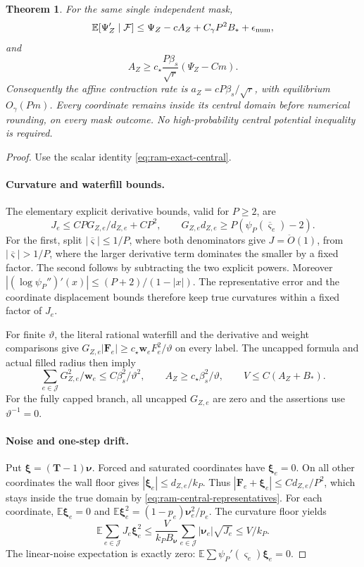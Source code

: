 \documentclass[11pt]{article}
\newtheorem{theorem}{Theorem}[section]
\theoremstyle{remark}
\newcommand{\ww}{\mathbf w}
\newcommand{\vvs}{\boldsymbol{\varsigma}}
\newcommand{\vvsbar}{\overline{\boldsymbol{\varsigma}}}
\newcommand{\FF}{\mathbf F}
\newcommand{\TT}{\mathbf T}
\newcommand{\nnu}{\boldsymbol{\nu}}
\newcommand{\xxi}{\boldsymbol{\xi}}
\newcommand{\Ex}{\mathbb E}
\renewcommand{\O}{\ddot{O}}
\begin{document}
\begin{theorem}
\label{thm:ram-central}
For the same single independent mask,
\[
 \Ex[\Psi_Z'\mid\mathcal F]
       \le\Psi_Z-cA_Z+C_\gamma P^2B_*+\epsilon_{\rm num},
\]
and
\[
 A_Z\ge c_\star\frac{P\beta_s}{\sqrt r}(\Psi_Z-Cm).
\]
Consequently the affine contraction rate is $a_Z=cP\beta_s/\sqrt r$, with
equilibrium $O_\gamma(Pm)$.
Every coordinate remains inside its central domain before numerical rounding, on
every mask outcome.
No high-probability central potential inequality is required.
\end{theorem} \begin{proof} Use the scalar identity
\eqref{eq:ram-exact-central}.

\paragraph{Curvature and waterfill bounds.}
The elementary explicit derivative bounds, valid for $P\ge2$, are
\[
 J_e\le CP G_{Z,e}/d_{Z,e}+CP^2,
 \qquad G_{Z,e}d_{Z,e}\ge P(\psi_P(\vvsbar_e)-2).
\]
For the first, split $|\vvsbar|\le1/P$, where both denominators give $J=\O(1)$, from
$|\vvsbar|>1/P$, where the larger derivative term dominates the smaller by a fixed
factor.
The second follows by subtracting the two explicit powers.
Moreover $|(\log\psi_P'')'(x)|\le(P+2)/(1-|x|)$.
The representative error and the coordinate displacement bounds therefore keep
true curvatures within a fixed factor of $J_e$.

For finite $\vartheta$, the literal rational waterfill and the derivative and
weight comparisons give $G_{Z,e}|\FF_e|\ge c_\star \ww_eF_e^2/\vartheta$ on every label.
The uncapped formula and actual filled radius then imply
\[
 \sum_{e\in\mathcal J}G_{Z,e}^2/\ww_e
                         \le C\beta_s^2/\vartheta^2,
 \qquad A_Z\ge c_\star\beta_s^2/\vartheta,
 \qquad V\le C(A_Z+B_*).
\]
For the fully capped branch, all uncapped $G_{Z,e}$ are zero and the assertions
use $\vartheta^{-1}=0$.

\paragraph{Noise and one-step drift.}
Put $\xxi=(\TT-1)\nnu$.
Forced and saturated coordinates have $\xxi_e=0$.
On all other coordinates the wall floor gives $|\xxi_e|\le d_{Z,e}/k_P$.
Thus $|\FF_e+\xxi_e|\le C d_{Z,e}/P^2$, which stays inside the true domain by
\eqref{eq:ram-central-representatives}.
For each coordinate, $\Ex\xxi_e=0$ and $\Ex\xxi_e^2=(1-p_e)\nnu_e^2/p_e$.
The curvature floor yields
\[
 \Ex\sum_{e\in\mathcal J}J_e\xxi_e^2
 \le\frac{V}{k_PB_{\nnu}}
                \sum_{e\in\mathcal J}|\nnu_e|\sqrt{J_e}
 \le V/k_P.
\]
The linear-noise expectation is exactly zero: $\Ex\sum\psi_P'(\vvs_e)\xxi_e=0$.


\end{proof}
\end{document}
